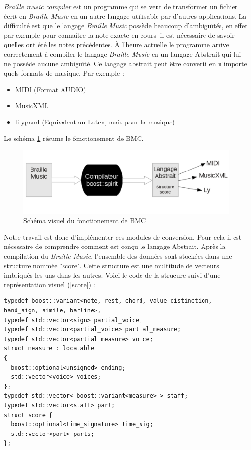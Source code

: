 
\textit{Braille music compiler} est un programme qui se veut de
transformer un fichier écrit en \textit{Braille Music} en un autre langage
utilisable par d'autres applications. La difficulté est que le langage
\textit{Braille Music} possède beaucoup d'ambiguïtés, en effet par exemple
pour connaître la note exacte en cours, il est nécessaire de savoir
quelles ont été les notes précédentes. \`A l'heure actuelle le programme
arrive correctement à compiler le langage \textit{Braille Music} en un
langage Abstrait qui lui ne possède aucune ambiguïté. Ce langage
abstrait peut être converti en n'importe quels formats de musique. Par
exemple : 

\begin{itemize}
\item MIDI (Format AUDIO)
\item MusicXML 
\item lilypond (Equivalent au Latex, mais pour la musique)
\end{itemize}
Le schéma \ref{compiler} résume le fonctionement de BMC.

\begin{figure}[!h]
  \centering
  \includegraphics[width=1\textwidth]{images/fonction-bmc.png}
  \caption{Schéma visuel du fonctionement de BMC}
  \label{compiler}
\end{figure}

Notre travail est donc d'implémenter ces modules de conversion. Pour
cela il est nécessaire de comprendre comment est conçu le langage
Abstrait. Après la compilation du \textit{Braille Music}, l'ensemble des
données sont stockées dans une structure nommée "score". Cette
structure est une multitude de vecteurs imbriqués les uns dans les
autres. Voici le code de la strucure suivi d'une représentation visuel (\ref{score})
:

\begin{verbatim}
typedef boost::variant<note, rest, chord, value_distinction, hand_sign, simile, barline>;
typedef std::vector<sign> partial_voice;
typedef std::vector<partial_voice> partial_measure;
typedef std::vector<partial_measure> voice;
struct measure : locatable
{
  boost::optional<unsigned> ending;
  std::vector<voice> voices;
};
typedef std::vector< boost::variant<measure> > staff;
typedef std::vector<staff> part;
struct score {
  boost::optional<time_signature> time_sig;
  std::vector<part> parts;
};
\end{verbatim}

